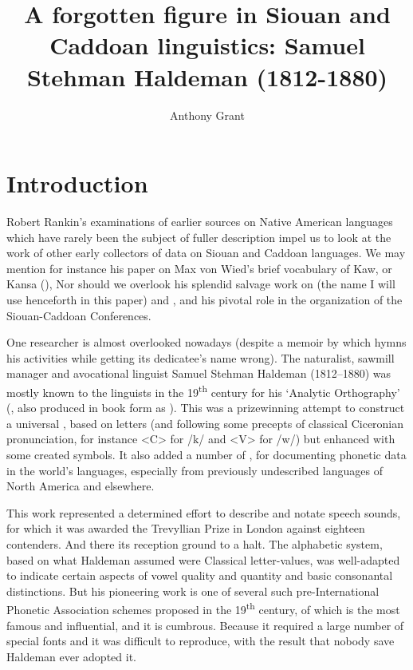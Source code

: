 \documentclass[output=paper]{LSP/langsci}
\author{Anthony Grant}
\title{A forgotten figure in {Siouan} and {Caddoan} linguistics:  {Samuel Stehman Haldeman} (1812-1880)}
\begin{document}
\section{Introduction}

 
Robert Rankin's examinations of earlier sources on Native American languages which have rarely been the subject of fuller description impel us to look at the work of other early collectors of data on Siouan and Caddoan languages. We may mention for instance his paper on Max von Wied's \citeyearpar{Maximilian18391841} brief vocabulary of Kaw,  or Kansa  (\citealt{Rankin1994}), Nor should we overlook his splendid salvage work on  (the name I will use henceforth in this paper) and , and his pivotal role in the organization of the Siouan-Caddoan Conferences.
 

One researcher is almost overlooked nowadays (despite a memoir by \citealt{Lesley1881} which hymns his activities while getting its dedicatee's name wrong). The naturalist, sawmill manager and avocational linguist Samuel Stehman Haldeman (1812--1880)  was mostly known to the linguists in the 19\textsuperscript{th} century for his `Analytic Orthography' (\citealt{Haldeman1859}, also produced in book form as \citealt{Haldeman1860}). This was a prizewinning attempt to construct a  universal , based on  letters (and following some precepts of classical Ciceronian  pronunciation, for instance <C> for /k/ and <V> for /w/) but enhanced with some created symbols. It also added a number of , for documenting phonetic data in the world's languages, especially from previously undescribed languages of North America and elsewhere.

This work represented a determined effort to describe and notate speech sounds, for which it was awarded the Trevyllian Prize in London against eighteen contenders. And there its reception ground to a halt. The alphabetic system, based on what Haldeman assumed were Classical  letter-values, was well-adapted to indicate certain aspects of vowel quality and quantity and basic consonantal distinctions. But his pioneering work is one of several such pre-International Phonetic Association  schemes proposed in the 19\textsuperscript{th} century, of which \citet{Lepsius1863} is the most famous and influential, and it is cumbrous.  Because it required a large number of special fonts and  it was difficult to reproduce, with the result that nobody save Haldeman ever adopted it.    
\end{document}
